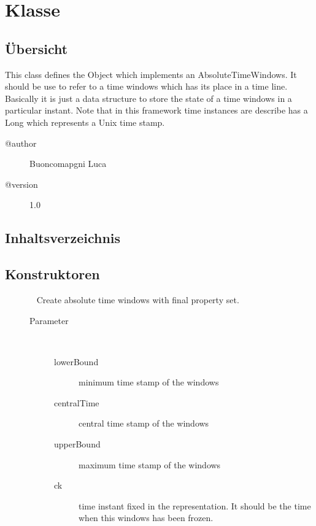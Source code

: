 
\section[AbsoluteTimeWindow]{Klasse }\label{ontologyFramework.OFDataMapping.ReservatedDataType.AbsoluteTimeWindow-class}
\subsection{Übersicht}
This class defines the Object which implements an AbsoluteTimeWindows.
 It should be use to refer to a time windows which has its place
 in a time line. Basically it is just a data structure to store
 the state of a time windows in a particular instant.
 Note that in this framework time instances are describe has a Long 
 which represents a Unix time stamp.
\begin{description}
\item[@author] 
Buoncomapgni Luca
\item[@version] 
1.0
\end{description}
\subsection{Inhaltsverzeichnis}
\subsection{Konstruktoren}
\begin{description}
\item[{\label{ontologyFramework.OFDataMapping.ReservatedDataType.AbsoluteTimeWindow(java.lang.Long,java.lang.Long,java.lang.Long,java.lang.Long)}}]
~ Create absolute time windows with final property set.
\begin{description}
\item[Parameter] ~
\begin{description}
\item[lowerBound]
minimum time stamp of the windows
\item[centralTime]
central time stamp of the windows
\item[upperBound]
maximum time stamp of the windows
\item[ck]
time instant fixed in the representation. It should be the time
 when this windows has been frozen.
\end{description}
\end{description}
\end{description}
